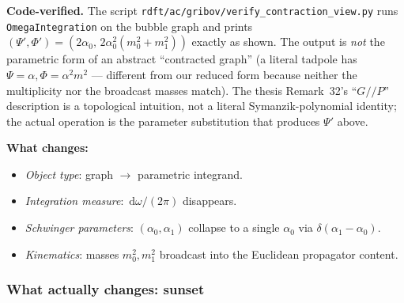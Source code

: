 \documentclass[11pt,a4paper]{article}
\renewcommand{\dd}[1]{\,\mathrm{d}#1}
\theoremstyle{definition}
\theoremstyle{plain}
\begin{document}
\begin{cfacbox}
\medskip
\textbf{Code-verified.}  The script
\texttt{rdft/ac/gribov/verify\_contraction\_view.py} runs
\texttt{OmegaIntegration} on the bubble graph and prints
$(\Psi', \Phi') = (2\alpha_0,\, 2\alpha_0^2(m_0^2 + m_1^2))$
exactly as shown.  The output is \emph{not} the parametric form of an
abstract ``contracted graph'' (a literal tadpole has $\Psi = \alpha,
\Phi = \alpha^2 m^2$ --- different from our reduced form because
neither the multiplicity nor the broadcast masses match).  The thesis
Remark~32's ``$G//P$'' description is a topological intuition, not a
literal Symanzik-polynomial identity; the actual operation is the
parameter substitution that produces $\Psi'$ above.

\textbf{What changes:}
\begin{itemize}[leftmargin=2em, itemsep=0pt]
  \item \emph{Object type}: graph $\to$ parametric integrand.
  \item \emph{Integration measure}: $\dd\omega/(2\pi)$ disappears.
  \item \emph{Schwinger parameters}: $(\alpha_0, \alpha_1)$ collapse
    to a single $\alpha_0$ via $\delta(\alpha_1 - \alpha_0)$.
  \item \emph{Kinematics}: masses $m_0^2, m_1^2$ broadcast into the
    Euclidean propagator content.
\end{itemize}
\end{cfacbox}

\subsubsection{What actually changes: sunset}
\end{document}
